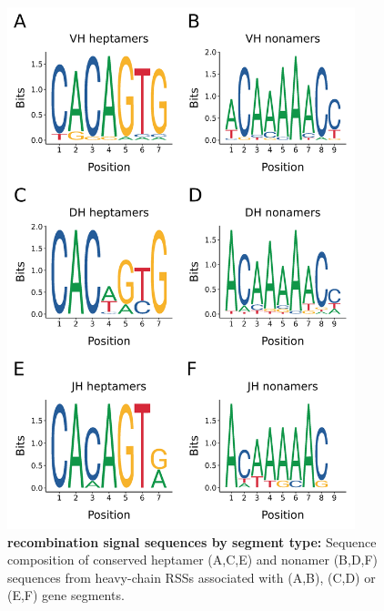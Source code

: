 \begin{figure}
	\centering
	\includegraphics[width=0.9\textwidth]{_Figures/png/nfu-rss-seqlogo-sep}
	\caption[\Nfu recombination signal sequences by segment type]{\textbf{\Nfu recombination signal sequences by segment type:} Sequence composition of conserved heptamer (A,C,E) and nonamer (B,D,F) sequences from \Nfu heavy-chain RSSs associated with \vh (A,B), \dh (C,D) or \jh (E,F) gene segments.}
	\label{fig:nfu-rss-seqlogo-sep}
	\end{figure} %


\FloatBarrier


